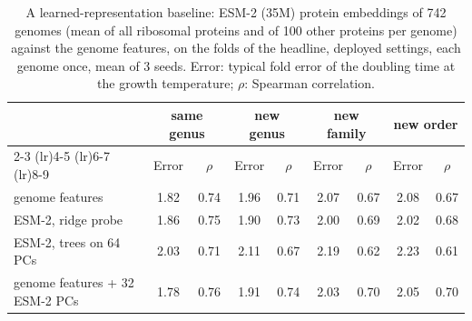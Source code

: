\begin{table}[ht]\centering\small\setlength{\tabcolsep}{4pt}
\caption{A learned-representation baseline: ESM-2 (35M) protein embeddings of 742 genomes (mean of all ribosomal proteins and of 100 other proteins per genome) against the genome features, on the folds of the headline, deployed settings, each genome once, mean of 3 seeds. Error: typical fold error of the doubling time at the growth temperature; $\rho$: Spearman correlation.}\label{tab:esm}
\begin{tabular}{lcccccccc}
\toprule
& \multicolumn{2}{c}{same genus} & \multicolumn{2}{c}{new genus} & \multicolumn{2}{c}{new family} & \multicolumn{2}{c}{new order} \\
\cmidrule(lr){2-3} \cmidrule(lr){4-5} \cmidrule(lr){6-7} \cmidrule(lr){8-9}
& Error & $\rho$ & Error & $\rho$ & Error & $\rho$ & Error & $\rho$ \\
\midrule
genome features & 1.82 & 0.74 & 1.96 & 0.71 & 2.07 & 0.67 & 2.08 & 0.67 \\
ESM-2, ridge probe & 1.86 & 0.75 & 1.90 & 0.73 & 2.00 & 0.69 & 2.02 & 0.68 \\
ESM-2, trees on 64 PCs & 2.03 & 0.71 & 2.11 & 0.67 & 2.19 & 0.62 & 2.23 & 0.61 \\
genome features + 32 ESM-2 PCs & 1.78 & 0.76 & 1.91 & 0.74 & 2.03 & 0.70 & 2.05 & 0.70 \\
\bottomrule
\end{tabular}
\end{table}
